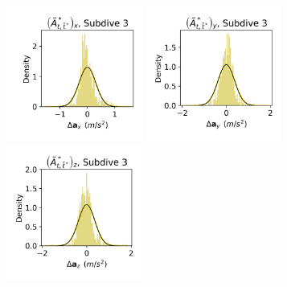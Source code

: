 \documentclass{article}
\begin{document}
\begin{center}
        \includegraphics[width=1.75in]{../Plots/2019/20190902-182840-CATs_OB_1_0_267_CarHHMM1_empirical_hist_Ax_2.png}
        \includegraphics[width=1.75in]{../Plots/2019/20190902-182840-CATs_OB_1_0_267_CarHHMM1_empirical_hist_Ay_2.png}
        \includegraphics[width=1.75in]{../Plots/2019/20190902-182840-CATs_OB_1_0_267_CarHHMM1_empirical_hist_Az_2.png}
        

\end{center}
\end{document}
